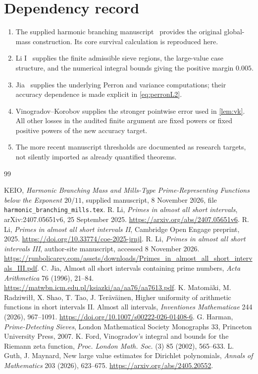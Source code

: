 \documentclass[11pt,a4paper]{article}
\theoremstyle{remark}
\begin{document}
\section*{Dependency record}

\begin{enumerate}[leftmargin=1.8em]
\item The supplied harmonic branching manuscript~\cite{KEIO}
      provides the original global-mass construction.
      Its core survival calculation is reproduced here.
\item Li I~\cite{LiI} supplies the finite admissible sieve regions,
      the large-value case structure, and the numerical integral
      bounds giving the positive margin $0.005$.
\item Jia~\cite{Jia} supplies the underlying Perron and variance
      computations; their accuracy dependence is made explicit in
      \eqref{eq:perronL2}.
\item Vinogradov--Korobov supplies the stronger pointwise error used
      in \cref{lem:vk}. All other losses in the audited finite
      argument are fixed powers or fixed positive powers of the
      new accuracy target.
\item The more recent manuscript thresholds are documented as
      research targets, not silently imported as already quantified
      theorems.
\end{enumerate}

\begin{thebibliography}{99}\small\raggedright
{}
KEIO, \emph{Harmonic Branching Mass and Mills-Type Prime-Representing
Functions below the Exponent $20/11$}, supplied manuscript,
8 November 2026, file \texttt{harmonic\_branching\_mills.tex}.
R. Li, \emph{Primes in almost all short intervals},
arXiv:2407.05651v6, 25 September 2025.
\url{https://arxiv.org/abs/2407.05651v6}.
R. Li, \emph{Primes in almost all short intervals II},
Cambridge Open Engage preprint, 2025.
\url{https://doi.org/10.33774/coe-2025-jrnjl}.
R. Li, \emph{Primes in almost all short intervals III},
author-site manuscript, accessed 8 November 2026.
\url{https://runbolicarey.com/assets/downloads/Primes_in_almost_all_short_intervals_III.pdf}.
C. Jia, Almost all short intervals containing prime numbers,
\emph{Acta Arithmetica} 76 (1996), 21--84.
\url{https://matwbn.icm.edu.pl/ksiazki/aa/aa76/aa7613.pdf}.
K. Matomäki, M. Radziwiłł, X. Shao, T. Tao, J. Teräväinen,
Higher uniformity of arithmetic functions in short intervals II.
Almost all intervals, \emph{Inventiones Mathematicae} 244 (2026),
967--1091.
\url{https://doi.org/10.1007/s00222-026-01408-6}.
G. Harman, \emph{Prime-Detecting Sieves},
London Mathematical Society Monographs 33,
Princeton University Press, 2007.
K. Ford, Vinogradov's integral and bounds for the Riemann zeta
function, \emph{Proc. London Math. Soc.} (3) 85 (2002), 565--633.
L. Guth, J. Maynard, New large value estimates for Dirichlet
polynomials, \emph{Annals of Mathematics} 203 (2026), 623--675.
\url{https://arxiv.org/abs/2405.20552}.
\end{thebibliography}
\end{document}
